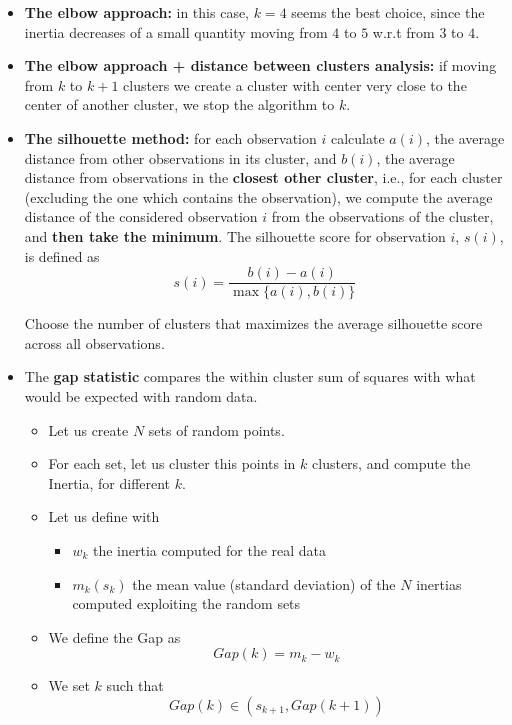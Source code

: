 \begin{itemize}
    \item \textbf{The elbow approach:} in this case, $k=4$ seems the best choice, since the inertia decreases of a small quantity moving from $4$ to $5$ w.r.t from $3$ to $4$.
    \item \textbf{The elbow approach + distance between clusters analysis:} if moving from $k$ to $k+1$ clusters we create a cluster with center very close to the center of another cluster, we stop the algorithm to $k$.
    \item \textbf{The silhouette method:} for each observation $i$ calculate $a( i)$, the average distance from other observations in its cluster, and $b( i)$, the average distance from observations in the \textbf{closest other cluster}, i.e., for each cluster (excluding the one which contains the observation), we compute the average distance of the considered observation $i$ from the observations of the cluster, and \textbf{then take the minimum}. The silhouette score for observation $i$, $s( i)$, is defined as
          \begin{equation*}
              s( i) =\frac{b( i) -a( i)}{\max\{a( i) ,b( i)\}}
          \end{equation*}
          
          Choose the number of clusters that maximizes the average silhouette score across all observations.
    \item The \textbf{gap statistic} compares the within cluster sum of squares with what would be expected with random data.
          \begin{itemize}
              \item Let us create $N$ sets of random points.
              \item For each set, let us cluster this points in $k$ clusters, and compute the Inertia, for different $k$.
              \item Let us define with
                    \begin{itemize}
                        \item $w_{k}$ the inertia computed for the real data
                        \item $m_{k}( s_{k})$ the mean value (standard deviation) of the $N$ inertias computed exploiting the random sets
                    \end{itemize}
              \item We define the Gap as
                    \begin{equation*}
                        Gap( k) =m_{k} -w_{k}
                    \end{equation*}
              \item We set $k$ such that
                    \begin{equation*}
                        Gap( k) \in ( s_{k+1} ,Gap( k+1))
                    \end{equation*}
          \end{itemize}
\end{itemize}
